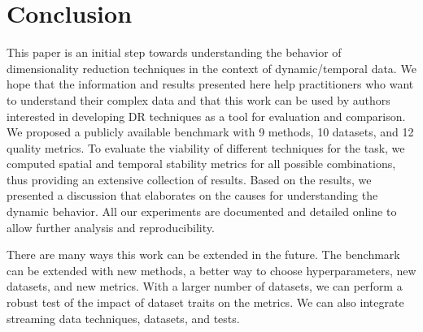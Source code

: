 \section{Conclusion}
\label{sec:conclusion}
%
This paper is an initial step towards understanding the behavior of dimensionality reduction techniques in the context of dynamic/temporal data. We hope that the information and results presented here help practitioners who want to understand their complex data and that this work can be used by authors interested in developing DR techniques as a tool for evaluation and comparison.
We proposed a publicly available benchmark with 9 methods, 10 datasets, and 12 quality metrics. To evaluate the viability of different techniques for the task, we computed spatial and temporal stability metrics for all possible combinations, thus providing an extensive collection of results. Based on the results, we presented a discussion that elaborates on the causes for understanding the dynamic behavior. All our experiments are documented and detailed online \citep{repo} to allow further analysis and reproducibility.

There are many ways this work can be extended in the future.
The benchmark can be extended with new methods, a better way to choose hyperparameters, new datasets, and new metrics. With a larger number of datasets, we can perform a robust test of the impact of dataset traits on the metrics.
We can also integrate streaming data techniques, datasets, and tests.

\newpage
    
